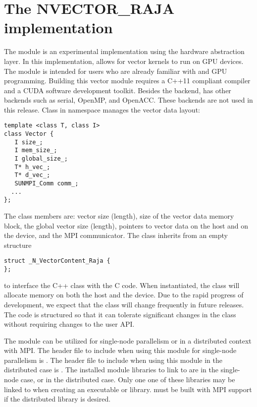 %
\section{The NVECTOR\_RAJA implementation}\label{ss:nvec_raja}

The {\nvecraja} module is an experimental {\nvector} implementation using the
\href{https://software.llnl.gov/RAJA/}{\raja} hardware abstraction layer.
In this implementation, {\raja}
allows for {\sundials} vector kernels to run on GPU devices. The module is intended for users
who are already familiar with {\raja} and GPU programming. Building this vector
module requires a C++11 compliant compiler and a CUDA software development toolkit.
Besides the {\cuda} backend, {\raja} has other backends such as serial, OpenMP,
and OpenACC. These backends are not used in this {\sundials} release.
Class  in namespace  manages the vector data layout:
\begin{verbatim}
template <class T, class I>
class Vector {
   I size_;
   I mem_size_;
   I global_size_;
   T* h_vec_;
   T* d_vec_;
   SUNMPI_Comm comm_;
  ...
};
\end{verbatim}
The class members are: vector size (length), size of the vector data
memory block, the global vector size (length), pointers to vector data
on the host and on the device, and the MPI communicator. The class
 inherits from an empty structure
\begin{verbatim}
struct _N_VectorContent_Raja {
};
\end{verbatim}
to interface the C++ class with the {\nvector} C code. When instantiated, the class
 will allocate memory on both the host and the device. Due to the rapid
progress of {\raja} development, we expect that the 
class will change frequently in future {\sundials} releases. The code is
structured so that it can tolerate significant changes in the
 class without requiring changes to the user API.


The {\nvecraja} module can be utilized for single-node parallelism or in a distributed context with MPI.
The header file to include when using this module for single-node parallelism is .
The header file to include when using this module in the distributed case is .
The installed module libraries to link to are  in the single-node case, or  in the distributed case. Only one one of these libraries may be linked to when creating an executable or library. {\sundials} must be built with
MPI support if the distributed library is desired.


